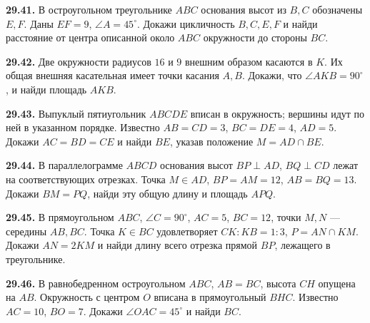 \noindent\begin{minipage}[t]{\linewidth}\textbf{29.41.}\starmark{} В остроугольном треугольнике \(ABC\) основания высот из \(B,C\) обозначены \(E,F\). Даны \(EF=9\), \(\angle A=45^\circ\). Докажи цикличность \(B,C,E,F\) и найди расстояние от центра описанной около \(ABC\) окружности до стороны \(BC\).\par\end{minipage}\par
\noindent\begin{minipage}[t]{\linewidth}\textbf{29.42.}\starmark{} Две окружности радиусов \(16\) и \(9\) внешним образом касаются в \(K\). Их общая внешняя касательная имеет точки касания \(A,B\). Докажи, что \(\angle AKB=90^\circ\), и найди площадь \(AKB\).\par\end{minipage}\par
\noindent\begin{minipage}[t]{\linewidth}\textbf{29.43.}\starmark{} Выпуклый пятиугольник \(ABCDE\) вписан в окружность; вершины идут по ней в указанном порядке. Известно \(AB=CD=3\), \(BC=DE=4\), \(AD=5\). Докажи \(AC=BD=CE\) и найди \(BE\), указав положение \(M=AD\cap BE\).\par\end{minipage}\par
\noindent\begin{minipage}[t]{\linewidth}\textbf{29.44.}\starmark{} В параллелограмме \(ABCD\) основания высот \(BP\perp AD\), \(BQ\perp CD\) лежат на соответствующих отрезках. Точка \(M\in AD\), \(BP=AM=12\), \(AB=BQ=13\). Докажи \(BM=PQ\), найди эту общую длину и площадь \(APQ\).\par\end{minipage}\par
\noindent\begin{minipage}[t]{\linewidth}\textbf{29.45.}\starmark{} В прямоугольном \(ABC\), \(\angle C=90^\circ\), \(AC=5\), \(BC=12\), точки \(M,N\) --- середины \(AB,BC\). Точка \(K\in BC\) удовлетворяет \(CK:KB=1:3\), \(P=AN\cap KM\). Докажи \(AN=2KM\) и найди длину всего отрезка прямой \(BP\), лежащего в треугольнике.\par\end{minipage}\par
\noindent\begin{minipage}[t]{\linewidth}\textbf{29.46.}\starmark{} В равнобедренном остроугольном \(ABC\), \(AB=BC\), высота \(CH\) опущена на \(AB\). Окружность с центром \(O\) вписана в прямоугольный \(BHC\). Известно \(AC=10\), \(BO=7\). Докажи \(\angle OAC=45^\circ\) и найди \(BC\).\par\end{minipage}\par
